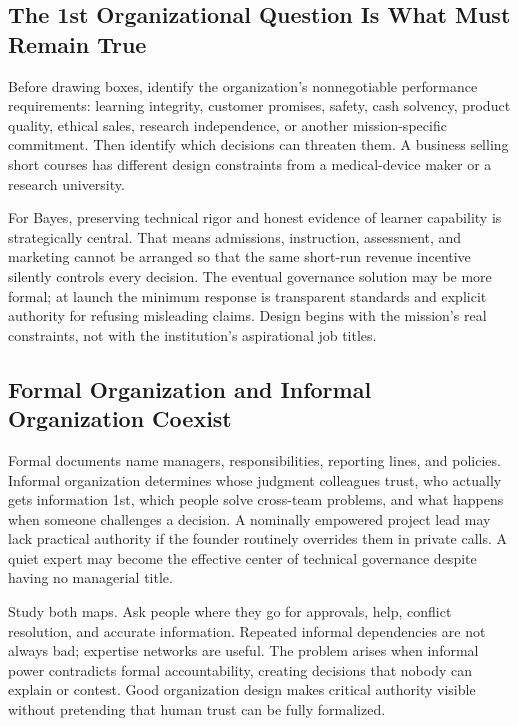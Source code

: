 \subsection{The 1st Organizational Question Is What Must Remain True}
\label{sec:what_must_remain_true}

Before drawing boxes, identify the organization's nonnegotiable performance requirements: learning integrity, customer promises, safety, cash solvency, product quality, ethical sales, research independence, or another mission-specific commitment. Then identify which decisions can threaten them. A business selling short courses has different design constraints from a medical-device maker or a research university.

For Bayes, preserving technical rigor and honest evidence of learner capability is strategically central. That means admissions, instruction, assessment, and marketing cannot be arranged so that the same short-run revenue incentive silently controls every decision. The eventual governance solution may be more formal; at launch the minimum response is transparent standards and explicit authority for refusing misleading claims. Design begins with the mission's real constraints, not with the institution's aspirational job titles.

\subsection{Formal Organization and Informal Organization Coexist}
\label{sec:formal_informal_coexist}

Formal documents name managers, responsibilities, reporting lines, and policies. Informal organization determines whose judgment colleagues trust, who actually gets information 1st, which people solve cross-team problems, and what happens when someone challenges a decision. A nominally empowered project lead may lack practical authority if the founder routinely overrides them in private calls. A quiet expert may become the effective center of technical governance despite having no managerial title.

Study both maps. Ask people where they go for approvals, help, conflict resolution, and accurate information. Repeated informal dependencies are not always bad; expertise networks are useful. The problem arises when informal power contradicts formal accountability, creating decisions that nobody can explain or contest. Good organization design makes critical authority visible without pretending that human trust can be fully formalized.

